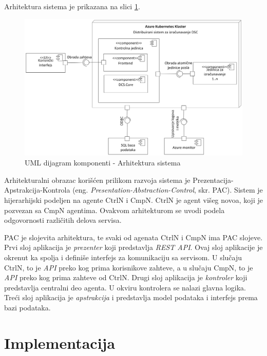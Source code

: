 \documentclass[12pt,oneside]{memoir}
\begin{document}
Arhitektura sistema je prikazana na slici \ref{fig:arhitektura}.

\begin{figure}[!ht]
  \centering
  \includegraphics[width=1.0\textwidth]{./images/arhitektura_sistema_dijagram_komponenti.png}
  \caption{UML dijagram komponenti - Arhitektura sistema}
  \label{fig:arhitektura}
\end{figure}

Arhitekturalni obrazac korišćen prilikom razvoja sistema je Prezentacija-Apstrakcija-Kontrola (eng. \emph{Presentation-Abstraction-Control}, skr. PAC). Sistem je hijerarhijski podeljen na agente CtrlN i CmpN. CtrlN je agent višeg novoa, koji je pozvezan sa CmpN agentima. Ovakvom arhitekturom se uvodi podela odgovornosti različitih delova servisa.

PAC je slojevita arhitektura, te svaki od agenata CtrlN i CmpN ima PAC slojeve. Prvi sloj aplikacija je \emph{prezenter} koji predstavlja \emph{REST API}. Ovaj sloj aplikacije je okrenut ka spolja i definiše interfejs za komunikaciju sa servisom. U slučaju CtrlN, to je \emph{API} preko kog prima korisnikove zahteve, a u slučaju CmpN, to je \emph{API} preko kog prima zahteve od CtrlN. Drugi sloj aplikacija je \emph{kontroler} koji predstavlja centralni deo agenta. U okviru kontrolera se nalazi glavna logika. Treći sloj aplikacija je \emph{apstrakcija} i predstavlja model podataka i interfejs prema bazi podataka. 


\section{Implementacija}
\label{sec:implementacija}
\end{document}
